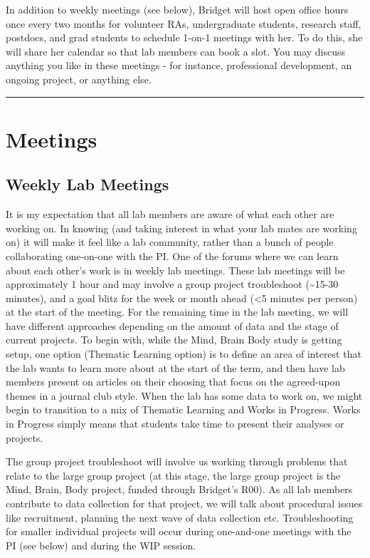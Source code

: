 \documentclass[
]{book}
\begin{document}
In addition to weekly meetings (see below), Bridget will host open office hours once every two months for volunteer RAs, undergraduate students, research staff, postdocs, and grad students to schedule 1-on-1 meetings with her. To do this, she will share her calendar so that lab members can book a slot. You may discuss anything you like in these meetings - for instance, professional development, an ongoing project, or anything else.

\begin{center}\rule{0.5\linewidth}{0.5pt}\end{center}

\hypertarget{meetings}{%
\section{Meetings}\label{meetings}}

\hypertarget{weekly-lab-meetings}{%
\subsection{Weekly Lab Meetings}\label{weekly-lab-meetings}}

It is my expectation that all lab members are aware of what each other are working on. In knowing (and taking interest in what your lab mates are working on) it will make it feel like a lab community, rather than a bunch of people collaborating one-on-one with the PI. One of the forums where we can learn about each other's work is in weekly lab meetings. These lab meetings will be approximately 1 hour and may involve a group project troubleshoot (\textasciitilde15-30 minutes), and a goal blitz for the week or month ahead (\textless5 minutes per person) at the start of the meeting. For the remaining time in the lab meeting, we will have different approaches depending on the amount of data and the stage of current projects. To begin with, while the Mind, Brain Body study is getting setup, one option (Thematic Learning option) is to define an area of interest that the lab wants to learn more about at the start of the term, and then have lab members present on articles on their choosing that focus on the agreed-upon themes in a journal club style. When the lab has some data to work on, we might begin to transition to a mix of Thematic Learning and Works in Progress. Works in Progress simply means that students take time to present their analyses or projects.

The group project troubleshoot will involve us working through problems that relate to the large group project (at this stage, the large group project is the Mind, Brain, Body project, funded through Bridget's R00). As all lab members contribute to data collection for that project, we will talk about procedural issues like recruitment, planning the next wave of data collection etc. Troubleshooting for smaller individual projects will occur during one-and-one meetings with the PI (see below) and during the WIP session.
\end{document}
